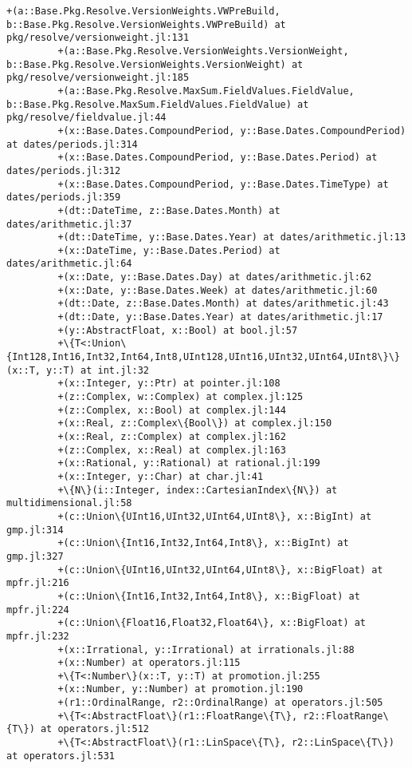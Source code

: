 \documentclass[11pt]{article}
\begin{document}
\begin{Verbatim}[commandchars=\\\{\}]
         +(a::Base.Pkg.Resolve.VersionWeights.VWPreBuild, b::Base.Pkg.Resolve.VersionWeights.VWPreBuild) at pkg/resolve/versionweight.jl:131
         +(a::Base.Pkg.Resolve.VersionWeights.VersionWeight, b::Base.Pkg.Resolve.VersionWeights.VersionWeight) at pkg/resolve/versionweight.jl:185
         +(a::Base.Pkg.Resolve.MaxSum.FieldValues.FieldValue, b::Base.Pkg.Resolve.MaxSum.FieldValues.FieldValue) at pkg/resolve/fieldvalue.jl:44
         +(x::Base.Dates.CompoundPeriod, y::Base.Dates.CompoundPeriod) at dates/periods.jl:314
         +(x::Base.Dates.CompoundPeriod, y::Base.Dates.Period) at dates/periods.jl:312
         +(x::Base.Dates.CompoundPeriod, y::Base.Dates.TimeType) at dates/periods.jl:359
         +(dt::DateTime, z::Base.Dates.Month) at dates/arithmetic.jl:37
         +(dt::DateTime, y::Base.Dates.Year) at dates/arithmetic.jl:13
         +(x::DateTime, y::Base.Dates.Period) at dates/arithmetic.jl:64
         +(x::Date, y::Base.Dates.Day) at dates/arithmetic.jl:62
         +(x::Date, y::Base.Dates.Week) at dates/arithmetic.jl:60
         +(dt::Date, z::Base.Dates.Month) at dates/arithmetic.jl:43
         +(dt::Date, y::Base.Dates.Year) at dates/arithmetic.jl:17
         +(y::AbstractFloat, x::Bool) at bool.jl:57
         +\{T<:Union\{Int128,Int16,Int32,Int64,Int8,UInt128,UInt16,UInt32,UInt64,UInt8\}\}(x::T, y::T) at int.jl:32
         +(x::Integer, y::Ptr) at pointer.jl:108
         +(z::Complex, w::Complex) at complex.jl:125
         +(z::Complex, x::Bool) at complex.jl:144
         +(x::Real, z::Complex\{Bool\}) at complex.jl:150
         +(x::Real, z::Complex) at complex.jl:162
         +(z::Complex, x::Real) at complex.jl:163
         +(x::Rational, y::Rational) at rational.jl:199
         +(x::Integer, y::Char) at char.jl:41
         +\{N\}(i::Integer, index::CartesianIndex\{N\}) at multidimensional.jl:58
         +(c::Union\{UInt16,UInt32,UInt64,UInt8\}, x::BigInt) at gmp.jl:314
         +(c::Union\{Int16,Int32,Int64,Int8\}, x::BigInt) at gmp.jl:327
         +(c::Union\{UInt16,UInt32,UInt64,UInt8\}, x::BigFloat) at mpfr.jl:216
         +(c::Union\{Int16,Int32,Int64,Int8\}, x::BigFloat) at mpfr.jl:224
         +(c::Union\{Float16,Float32,Float64\}, x::BigFloat) at mpfr.jl:232
         +(x::Irrational, y::Irrational) at irrationals.jl:88
         +(x::Number) at operators.jl:115
         +\{T<:Number\}(x::T, y::T) at promotion.jl:255
         +(x::Number, y::Number) at promotion.jl:190
         +(r1::OrdinalRange, r2::OrdinalRange) at operators.jl:505
         +\{T<:AbstractFloat\}(r1::FloatRange\{T\}, r2::FloatRange\{T\}) at operators.jl:512
         +\{T<:AbstractFloat\}(r1::LinSpace\{T\}, r2::LinSpace\{T\}) at operators.jl:531

\end{Verbatim}
\end{document}
